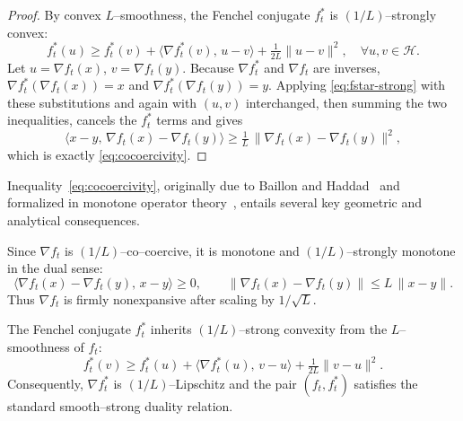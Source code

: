 \documentclass[11pt]{article}
\theoremstyle{plain}
\theoremstyle{definition}
\theoremstyle{remark}
\begin{document}
\begin{proof}
By convex $L$–smoothness, the Fenchel conjugate $f_t^*$ is $(1/L)$–strongly convex:
\begin{equation}\label{eq:fstar-strong}
f_t^*(u)\ge f_t^*(v)+\langle\nabla f_t^*(v),\,u-v\rangle
+\tfrac{1}{2L}\|u-v\|^2,
\quad \forall u,v\in\mathcal H.
\end{equation}
Let $u=\nabla f_t(x)$, $v=\nabla f_t(y)$.  
Because $\nabla f_t^*$ and $\nabla f_t$ are inverses,
$\nabla f_t^*(\nabla f_t(x))=x$ and $\nabla f_t^*(\nabla f_t(y))=y$.  
Applying \eqref{eq:fstar-strong} with these substitutions and again with $(u,v)$ interchanged,
then summing the two inequalities, cancels the $f_t^*$ terms and gives
\[
\langle x-y,\,\nabla f_t(x)-\nabla f_t(y)\rangle
\ge \tfrac{1}{L}\,\|\nabla f_t(x)-\nabla f_t(y)\|^2,
\]
which is exactly \eqref{eq:cocoercivity}.
\end{proof}



Inequality~\eqref{eq:cocoercivity}, originally due to
Baillon and Haddad~\cite{Baillon1977} and formalized in
monotone operator theory~\cite{Rockafellar1970,Bauschke2011},
entails several key geometric and analytical consequences.


Since $\nabla f_t$ is $(1/L)$–co–coercive, it is monotone and $(1/L)$–strongly monotone in the dual sense:
\begin{equation}
\langle\nabla f_t(x)-\nabla f_t(y),\,x-y\rangle \ge 0,
\qquad
\|\nabla f_t(x)-\nabla f_t(y)\|\le L\,\|x-y\|.
\label{eq:grad-lip}
\end{equation}
Thus $\nabla f_t$ is firmly nonexpansive after scaling by $1/\sqrt{L}$.

The Fenchel conjugate $f_t^*$ inherits $(1/L)$–strong convexity from the $L$–smoothness of $f_t$:
\begin{equation}
f_t^*(v)\ge f_t^*(u)
+\langle\nabla f_t^*(u),\,v-u\rangle
+\tfrac{1}{2L}\|v-u\|^2.
\label{eq:strong-conj}
\end{equation}
Consequently, $\nabla f_t^*$ is $(1/L)$–Lipschitz and the pair $(f_t,f_t^*)$ satisfies
the standard smooth–strong duality relation.
\end{document}
